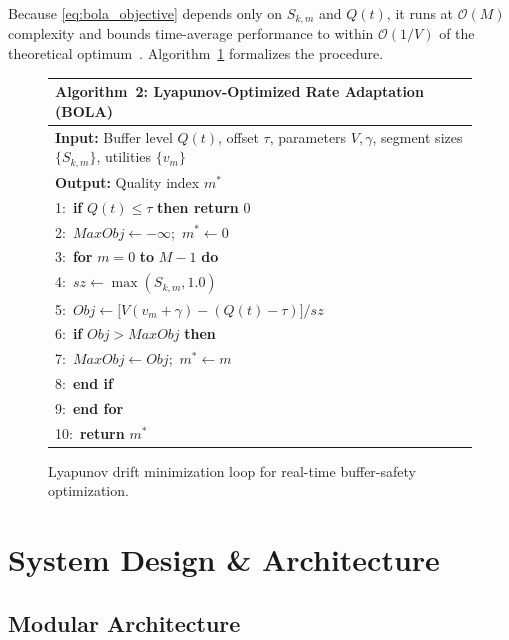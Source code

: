 \documentclass[conference]{IEEEtran}
\begin{document}
Because \eqref{eq:bola_objective} depends only on $S_{k,m}$ and $Q(t)$,
it runs at $\mathcal{O}(M)$ complexity and bounds time-average performance
to within $\mathcal{O}(1/V)$ of the theoretical
optimum~\cite{spiteri2020,neely2010}.  Algorithm~\ref{alg:bola_abr}
formalizes the procedure.

\begin{figure}[htbp]
\renewcommand{\arraystretch}{1.2}
\centering
\begin{tabular}{p{}}
\hline
\textbf{Algorithm~2: Lyapunov-Optimized Rate Adaptation (BOLA)}\\
\hline
\textbf{Input:} Buffer level $Q(t)$, offset $\tau$, parameters $V,\gamma$,
  segment sizes $\{S_{k,m}\}$, utilities $\{v_m\}$\\
\textbf{Output:} Quality index $m^*$\\
1:~\textbf{if} $Q(t)\le\tau$ \textbf{then return} $0$\\
2:~$\mathit{MaxObj}\leftarrow-\infty$;~$m^*\leftarrow 0$\\
3:~\textbf{for} $m=0$ \textbf{to} $M{-}1$ \textbf{do}\\
4:~\quad$\mathit{sz}\leftarrow\max(S_{k,m},1.0)$\\
5:~\quad$\mathit{Obj}\leftarrow\bigl[V(v_m+\gamma)-(Q(t)-\tau)\bigr]/\mathit{sz}$\\
6:~\quad\textbf{if} $\mathit{Obj}>\mathit{MaxObj}$ \textbf{then}\\
7:~\qquad$\mathit{MaxObj}\leftarrow\mathit{Obj}$;~$m^*\leftarrow m$\\
8:~\quad\textbf{end if}\\
9:~\textbf{end for}\\
10:~\textbf{return} $m^*$\\
\hline
\end{tabular}
\caption{Lyapunov drift minimization loop for real-time buffer-safety optimization.}
\label{alg:bola_abr}
\end{figure}

\section{System Design \& Architecture}

\subsection{Modular Architecture}
\end{document}

